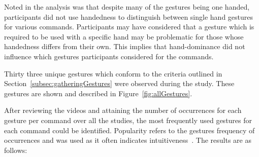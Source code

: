 \documentclass[link]{IWCOMP}
\begin{document}
Noted in the analysis was that despite many of the gestures being one handed, participants did not use handedness to distinguish between single hand gestures for various commands.
Participants may have considered that a gesture which is required to be used with a specific hand may be problematic for those whose handedness differs from their own.
This implies that hand-dominance did not influence which gestures participants considered for the commands.

Thirty three unique gestures which conform to the criteria outlined in Section~\ref{subsec:gatheringGestures} were observed during the study.
These gestures are shown and described in Figure~\ref{fig:allGestures}.  

After reviewing the videos and attaining the number of occurrences for each gesture per command over all the studies, the most frequently used gestures for each command could be identified.
Popularity refers to the gestures frequency of occurrences and was used as it often indicates intuitiveness~\cite{Grandhi2011}.
The results are as follows: \\
\end{document}
